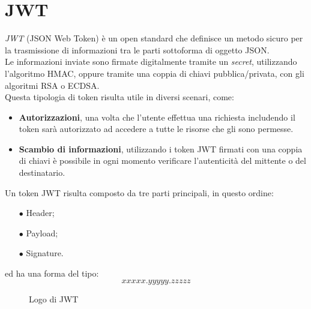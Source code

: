 \section{JWT}\label{sec:jwt}
\emph{JWT} (JSON Web Token) è un open standard che definisce un metodo sicuro per la trasmissione di informazioni tra le parti sottoforma di oggetto JSON.\\
Le informazioni inviate sono firmate digitalmente tramite un \emph{secret}, utilizzando l'algoritmo HMAC, oppure tramite una coppia di chiavi pubblica/privata, 
con gli algoritmi RSA o ECDSA. \cite{JWT}\\
Questa tipologia di token risulta utile in diversi scenari, come:
\begin{itemize}
	\item \textbf{Autorizzazioni}, una volta che l'utente effettua una richiesta includendo il token sarà autorizzato ad accedere a tutte le risorse che gli sono permesse.
	\item \textbf{Scambio di informazioni}, utilizzando i token JWT firmati con una coppia di chiavi è possibile in ogni momento verificare l'autenticità del mittente o del destinatario.
\end{itemize}

Un token JWT risulta composto da tre parti principali, in questo ordine:
\begin{itemize}
	\item[$\bullet$]Header;
	\item[$\bullet$]Payload;
	\item[$\bullet$]Signature.
\end{itemize}
ed ha una forma del tipo:
\[ xxxxx.yyyyy.zzzzz \]
\begin{figure}[h]
	\centering
	\caption{Logo di JWT}
	\label{fig:one}
\end{figure}

